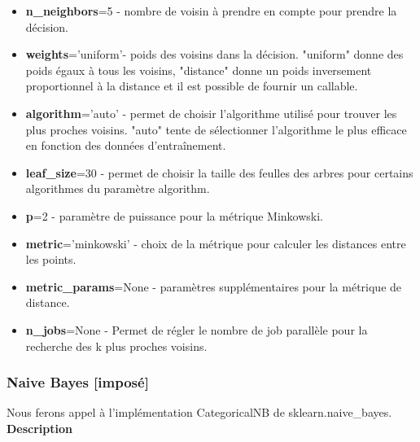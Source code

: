 \documentclass{ceri/sty/rapport}
\begin{document}
\begin{itemize}
    \item \textbf{n\_neighbors}=5 - nombre de voisin à prendre en compte pour prendre la décision.\\
    
    \item \textbf{weights}='uniform'- poids des voisins dans la décision. "uniform" donne des poids égaux à tous les voisins, "distance" donne un poids inversement proportionnel à la distance et il est possible de fournir un callable.\\
    
    \item \textbf{algorithm}='auto' - permet de choisir l'algorithme utilisé pour trouver les plus proches voisins. "auto" tente de sélectionner l'algorithme le plus efficace en fonction des données d'entraînement.\\
    
    \item \textbf{leaf\_size}=30 - permet de choisir la taille des feulles des arbres pour certains algorithmes du paramètre algorithm.\\
    
    \item \textbf{p}=2 - paramètre de puissance pour la métrique Minkowski.\\
    
    \item \textbf{metric}='minkowski' - choix de la métrique pour calculer les distances entre les points.\\
    
    \item \textbf{metric\_params}=None - paramètres supplémentaires pour la métrique de distance.\\
    
    \item \textbf{n\_jobs}=None - Permet de régler le nombre de job parallèle pour la recherche des k plus proches voisins.
\end{itemize}


\subsubsection{Naive Bayes [imposé]}

Nous ferons appel à l'implémentation CategoricalNB de sklearn.naive\_bayes.\\

\textbf{Description}
\end{document}
